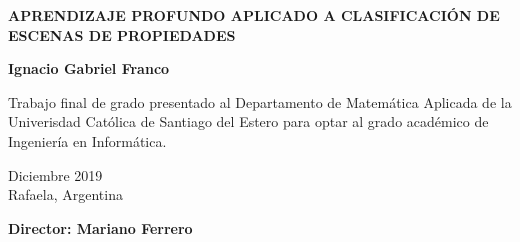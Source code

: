 \begin{titlepage}
	
	\begin{center}
		
		\vspace*{4\baselineskip}
	
		
		{\LARGE \textbf{APRENDIZAJE PROFUNDO APLICADO A CLASIFICACIÓN DE ESCENAS DE PROPIEDADES \\}}
		        \vspace*{1.5\baselineskip}

		
        \vspace*{1,5\baselineskip}

		\large{\textbf{Ignacio Gabriel Franco}}\\
		
		\vspace{1,5\baselineskip}
		
		\large{Trabajo final de grado presentado al Departamento de Matemática Aplicada de la Univerisdad Católica de Santiago del Estero para optar al grado académico de Ingeniería en Informática.} 
		
		\vspace{1,5\baselineskip}
		Diciembre 2019\\
		Rafaela, Argentina 
\vspace{1,5\baselineskip}

		\large{\textbf{Director: Mariano Ferrero}}\\ 

	\end{center}
	
	\vspace*{4\baselineskip}
	
\end{titlepage}